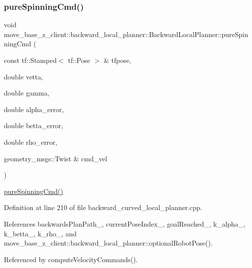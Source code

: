 \subsubsection{\texorpdfstring{pure\+Spinning\+Cmd()}{pureSpinningCmd()}}
{\footnotesize\ttfamily void move\+\_\+base\+\_\+z\+\_\+client\+::backward\+\_\+local\+\_\+planner\+::\+Backward\+Local\+Planner\+::pure\+Spinning\+Cmd (\begin{DoxyParamCaption}\item[{const tf\+::\+Stamped$<$ tf\+::\+Pose $>$ \&}]{tfpose,  }\item[{double}]{vetta,  }\item[{double}]{gamma,  }\item[{double}]{alpha\+\_\+error,  }\item[{double}]{betta\+\_\+error,  }\item[{double}]{rho\+\_\+error,  }\item[{geometry\+\_\+msgs\+::\+Twist \&}]{cmd\+\_\+vel }\end{DoxyParamCaption})\hspace{0.3cm}{\ttfamily [private]}}

\hyperlink{classmove__base__z__client_1_1backward__local__planner_1_1BackwardLocalPlanner_a3b08865dc8e19750273d971336ecba3b}{pure\+Spinning\+Cmd()} 

Definition at line 210 of file backward\+\_\+curved\+\_\+local\+\_\+planner.\+cpp.



References backwards\+Plan\+Path\+\_\+, current\+Pose\+Index\+\_\+, goal\+Reached\+\_\+, k\+\_\+alpha\+\_\+, k\+\_\+betta\+\_\+, k\+\_\+rho\+\_\+, and move\+\_\+base\+\_\+z\+\_\+client\+::backward\+\_\+local\+\_\+planner\+::optional\+Robot\+Pose().



Referenced by compute\+Velocity\+Commands().


